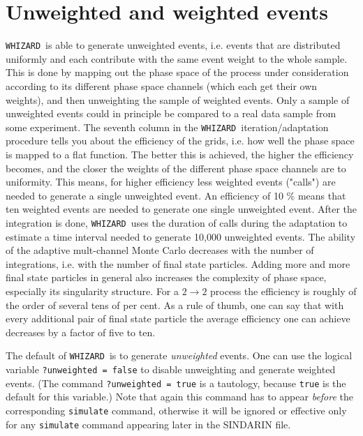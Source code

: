 \documentclass[12pt]{book}
\newcommand{\ttt}[1]{\texttt{#1}}
\newcommand{\whizard}{\texttt{WHIZARD}}
\begin{document}

\section{Unweighted and weighted events}

\whizard\ is able to generate unweighted events, i.e. events that are
distributed uniformly and each contribute with the same event weight
to the whole sample. This is done by mapping out the phase space of
the process under consideration according to its different phase space
channels (which each get their own weights), and then unweighting the 
sample of weighted events. Only a sample of unweighted events could in
principle be compared to a real data sample from some experiment. The
seventh column in the \whizard\ iteration/adaptation procedure tells you
about the efficiency of the grids, i.e. how well the phase space is
mapped to a flat function. The better this is achieved, the higher the
efficiency becomes, and the closer the weights of the different phase
space channels are to uniformity. This means, for higher efficiency
less weighted events ("calls") are needed to generate a single
unweighted event. An efficiency of 10 \% means that ten weighted
events are needed to generate one single unweighted event. After the
integration is done, \whizard\ uses the duration of calls during the
adaptation to estimate a time interval needed to generate 10,000
unweighted events. The ability of the adaptive mult-channel Monte
Carlo decreases with the number of integrations, i.e. with the number
of final state particles. Adding more and more final state particles
in general also increases the complexity of phase space, especially
its singularity structure. For a $2 \to 2$ process the efficiency is
roughly of the order of several tens of per cent. As a rule of thumb,
one can say that with every additional pair of final state particle
the average efficiency one can achieve decreases by a factor of five
to ten. 

The default of \whizard\ is to generate {\em unweighted} events. One can
use the logical variable \ttt{?unweighted = false} to disable
unweighting and generate weighted events. (The command
\ttt{?unweighted = true} is a tautology, because \ttt{true} is the
default for this variable.) Note that again this command has to appear
{\em before} the corresponding \ttt{simulate} command, otherwise it will
be ignored or effective only for any \ttt{simulate} command appearing
later in the SINDARIN file.
\end{document}
